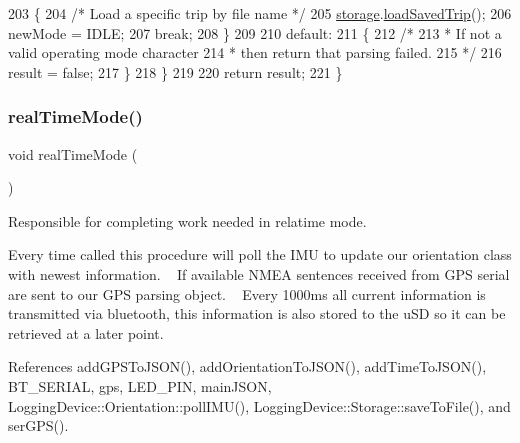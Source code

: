 \begin{DoxyCode}
203     \{
204       \textcolor{comment}{/* Load a specific trip by file name */}
205       \hyperlink{logging-device_8ino_a40059244119c00baa1b841119cfd1b2e}{storage}.\hyperlink{class_logging_device_1_1_storage_af56ca8289ed925300e3385114c561eec}{loadSavedTrip}();
206       newMode = IDLE;
207       \textcolor{keywordflow}{break};
208     \}
209 
210     \textcolor{keywordflow}{default}:
211     \{
212       \textcolor{comment}{/*}
213 \textcolor{comment}{       * If not a valid operating mode character}
214 \textcolor{comment}{       * then return that parsing failed.}
215 \textcolor{comment}{       */}
216       result = \textcolor{keyword}{false};
217     \}
218   \}
219 
220   \textcolor{keywordflow}{return} result;
221 \}
\end{DoxyCode}
\mbox{\label{logging-device_8ino_ab4c1c4c0fa047e336f9f4176406a54f1}} 
\subsubsection{\texorpdfstring{real\+Time\+Mode()}{realTimeMode()}}
{\footnotesize\ttfamily void real\+Time\+Mode (\begin{DoxyParamCaption}{ }\end{DoxyParamCaption})}



Responsible for completing work needed in relatime mode. 

Every time called this procedure will poll the I\+MU to update our orientation class with newest information. ~\newline
If available N\+M\+EA sentences received from G\+PS serial are sent to our G\+PS parsing object. ~\newline
 Every 1000ms all current information is transmitted via bluetooth, this information is also stored to the u\+SD so it can be retrieved at a later point. 

References add\+G\+P\+S\+To\+J\+S\+O\+N(), add\+Orientation\+To\+J\+S\+O\+N(), add\+Time\+To\+J\+S\+O\+N(), B\+T\+\_\+\+S\+E\+R\+I\+AL, gps, L\+E\+D\+\_\+\+P\+IN, main\+J\+S\+ON, Logging\+Device\+::\+Orientation\+::poll\+I\+M\+U(), Logging\+Device\+::\+Storage\+::save\+To\+File(), and ser\+G\+P\+S().


